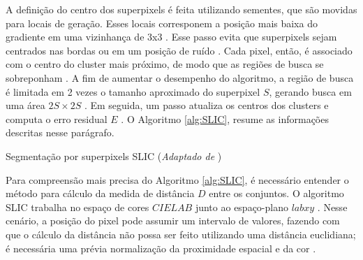 \begin{document}
A definição do centro dos superpixels é feita utilizando sementes, que são movidas para locais de geração. Esses locais corresponem a posição mais baixa do gradiente em uma vizinhança de 3x3 \cite{SLIC}. Esse passo evita que superpixels sejam centrados nas bordas ou em um posição de ruído \cite{SLIC}. Cada pixel, então, é associado com o centro do cluster mais próximo, de modo que as regiões de busca se sobreponham \cite{SLIC}. A fim de aumentar o desempenho do algoritmo, a região de busca é limitada em 2 vezes o tamanho aproximado do superpixel $S$, gerando busca em uma área $2S \times 2S$ \cite{SLIC}. Em seguida, um passo atualiza os centros dos clusters e computa o erro residual $E$ \cite{SLIC}. O Algoritmo \ref{alg:SLIC}, resume as informações descritas nesse parágrafo.

\begin{algorithm}
    \caption{Segmentação por superpixels SLIC (\textit{Adaptado de } \cite{SLIC})}
    \label{alg:SLIC}
    \begin{algorithmic}[1]
        \Repeat
                \EndIf
                \EndFor
            \EndFor    
    \end{algorithmic}
\end{algorithm}


Para compreensão mais precisa do Algoritmo \ref{alg:SLIC}, é necessário entender o método para cálculo da medida de distância $D$ entre os conjuntos. O algoritmo SLIC trabalha no espaço de cores $CIELAB$ junto ao espaço-plano $labxy$ \cite{SLIC}. Nesse cenário, a posição do pixel pode assumir um intervalo de valores, fazendo com que o cálculo da distância não possa ser feito utilizando uma distância euclidiana; é necessária uma prévia normalização da proximidade espacial e da cor \cite{SLIC}. 
\end{document}
